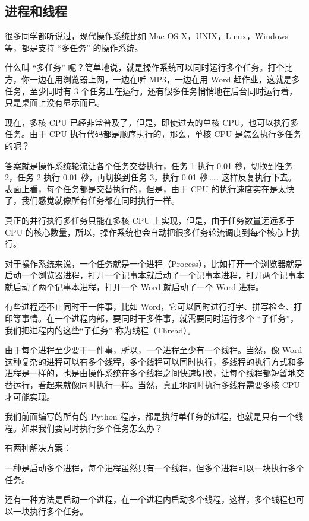 \hypertarget{ux8fdbux7a0bux548cux7ebfux7a0b}{%
\subsection{进程和线程}\label{ux8fdbux7a0bux548cux7ebfux7a0b}}

很多同学都听说过，现代操作系统比如 Mac OS X，UNIX，Linux，Windows
等，都是支持 ``多任务'' 的操作系统。

什么叫 ``多任务''
呢？简单地说，就是操作系统可以同时运行多个任务。打个比方，你一边在用浏览器上网，一边在听
MP3，一边在用 Word 赶作业，这就是多任务，至少同时有 3
个任务正在运行。还有很多任务悄悄地在后台同时运行着，只是桌面上没有显示而已。

现在，多核 CPU 已经非常普及了，但是，即使过去的单核
CPU，也可以执行多任务。由于 CPU 执行代码都是顺序执行的，那么，单核 CPU
是怎么执行多任务的呢？

答案就是操作系统轮流让各个任务交替执行，任务 1 执行 0.01 秒，切换到任务
2，任务 2 执行 0.01 秒，再切换到任务 3，执行 0.01 秒\ldots\ldots{}
这样反复执行下去。表面上看，每个任务都是交替执行的，但是，由于 CPU
的执行速度实在是太快了，我们感觉就像所有任务都在同时执行一样。

真正的并行执行多任务只能在多核 CPU 上实现，但是，由于任务数量远远多于
CPU
的核心数量，所以，操作系统也会自动把很多任务轮流调度到每个核心上执行。

对于操作系统来说，一个任务就是一个进程（Process），比如打开一个浏览器就是启动一个浏览器进程，打开一个记事本就启动了一个记事本进程，打开两个记事本就启动了两个记事本进程，打开一个
Word 就启动了一个 Word 进程。

有些进程还不止同时干一件事，比如
Word，它可以同时进行打字、拼写检查、打印等事情。在一个进程内部，要同时干多件事，就需要同时运行多个
``子任务''，我们把进程内的这些``子任务'' 称为线程（Thread）。

由于每个进程至少要干一件事，所以，一个进程至少有一个线程。当然，像 Word
这种复杂的进程可以有多个线程，多个线程可以同时执行，多线程的执行方式和多进程是一样的，也是由操作系统在多个线程之间快速切换，让每个线程都短暂地交替运行，看起来就像同时执行一样。当然，真正地同时执行多线程需要多核
CPU 才可能实现。

我们前面编写的所有的 Python
程序，都是执行单任务的进程，也就是只有一个线程。如果我们要同时执行多个任务怎么办？

有两种解决方案：

一种是启动多个进程，每个进程虽然只有一个线程，但多个进程可以一块执行多个任务。

还有一种方法是启动一个进程，在一个进程内启动多个线程，这样，多个线程也可以一块执行多个任务。

